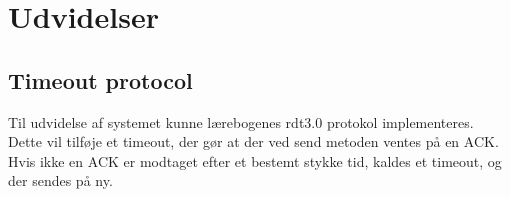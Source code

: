 \chapter{Udvidelser}

\section{Timeout protocol}
Til udvidelse af systemet kunne lærebogenes rdt3.0 protokol implementeres. Dette vil tilføje et timeout, der gør at der ved send metoden ventes på en ACK. Hvis ikke en ACK er modtaget efter et bestemt stykke tid, kaldes et timeout, og der sendes på ny. 

